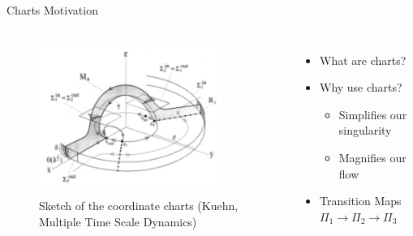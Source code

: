 \documentclass[11pt]{beamer}
\begin{document}
\begin{frame}{Charts Motivation}
\begin{columns}
\begin{figure}
	\centering
	\includegraphics[height=5cm,width=6cm]{Charts.png}
	\caption{Sketch of the coordinate charts (Kuehn, Multiple Time Scale Dynamics)}
\end{figure}    
\begin{itemize}
	\item What are charts?
	\item Why use charts?
	\begin{itemize}
		\item Simplifies our singularity
		\item Magnifies our flow 
	\end{itemize}
	\item Transition Maps $\Pi_1\to \Pi_2\to \Pi_3$
\end{itemize}

\end{columns}
\end{frame}
\end{document}
